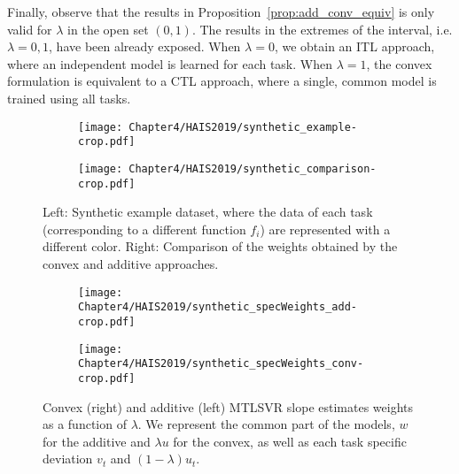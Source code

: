 Finally, observe that the results in Proposition~\ref{prop:add_conv_equiv} is only valid for $\lambda$ in the open set $(0, 1)$. The results in the extremes of the interval, i.e. $\lambda=0, 1$, have been already exposed. When $\lambda=0$, we obtain an ITL approach, where an independent model is learned for each task. When $\lambda=1$, the convex formulation is equivalent to a CTL approach, where a single, common model is trained using all tasks.

\begin{figure}
    \centering
    \begin{subfigure}[b]{0.45\textwidth}
        \centering
        \texttt{[image: Chapter4/HAIS2019/synthetic\_example-crop.pdf]}
    \end{subfigure}
    \hfill
    \begin{subfigure}[b]{0.45\textwidth}
        \centering
        \texttt{[image: Chapter4/HAIS2019/synthetic\_comparison-crop.pdf]}
    \end{subfigure}
    \caption{Left: Synthetic example dataset, where the data of each task (corresponding to a different function $f_i$) are represented with a different color.
        Right: Comparison of the weights obtained by the {convex} and {additive} approaches.}
    \label{fig:lines_slopes}
\end{figure}


\begin{figure}
    \centering
    \begin{subfigure}[b]{0.45\textwidth}
        \centering
        \texttt{[image: Chapter4/HAIS2019/synthetic\_specWeights\_add-crop.pdf]}
    \end{subfigure}
    \hfill
    \begin{subfigure}[b]{0.45\textwidth}
        \centering
        \texttt{[image: Chapter4/HAIS2019/synthetic\_specWeights\_conv-crop.pdf]}
    \end{subfigure}
    \caption{{Convex} (right) and {additive} (left) MTLSVR slope estimates weights as a function of $\lambda$. We represent the common part of the models, $w$ for the {additive} and $\lambda u$ for the {convex}, as well as each task specific deviation $v_t$ and $(1 - \lambda) u_t$.}
    \label{fig:synthetic_specWeights}
\end{figure}


